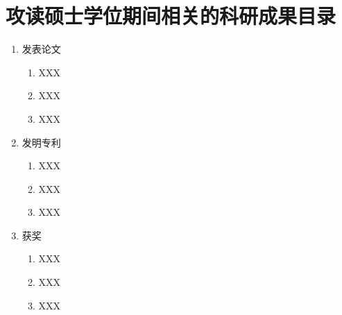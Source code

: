 \chapter{攻读硕士学位期间相关的科研成果目录}

\begin{enumerate}
	\item 发表论文
	\begin{enumerate}
		\item XXX
		\item XXX
		\item XXX
	\end{enumerate}
	\item 发明专利
	\begin{enumerate}
		\item XXX
		\item XXX
		\item XXX
	\end{enumerate}
	\item 获奖
	\begin{enumerate}
		\item XXX
		\item XXX
		\item XXX
	\end{enumerate}
	
\end{enumerate}